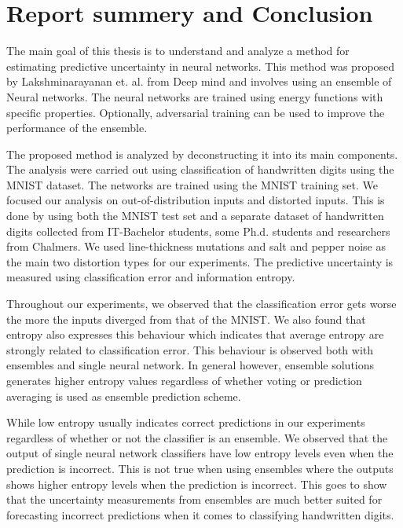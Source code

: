 \chapter{Report summery and Conclusion}

The main goal of this thesis is to understand and analyze a method for estimating predictive uncertainty in neural networks. This method was proposed by Lakshminarayanan et. al. from Deep mind and involves using an ensemble of Neural networks. The neural networks are trained using energy functions with specific properties. Optionally, adversarial training can be used to improve the performance of the ensemble.

The proposed method is analyzed by deconstructing it into its main components. The analysis were carried out using classification of handwritten digits using the MNIST dataset. The networks are trained using the MNIST training set. We focused our analysis on out-of-distribution inputs and distorted inputs. This is done by using both the MNIST test set and a separate dataset of handwritten digits collected from IT-Bachelor students, some Ph.d. students and researchers from Chalmers. We used line-thickness mutations and salt and pepper noise as the main two distortion types for our experiments. The predictive uncertainty is measured using classification error and information entropy.

Throughout our experiments, we observed that the classification error gets worse the more the inputs diverged from that of the MNIST. We also found that entropy also expresses this behaviour which indicates that average entropy are strongly related to classification error. This behaviour is observed both with ensembles and single neural network. In general however, ensemble solutions generates higher entropy values regardless of whether voting or prediction averaging is used as ensemble prediction scheme.

While low entropy usually indicates correct predictions in our experiments regardless of whether or not the classifier is an ensemble. We observed that the output of single neural network classifiers have low entropy levels even when the prediction is incorrect. This is not true when using ensembles where the outputs shows higher entropy levels when the prediction is incorrect. This goes to show that the uncertainty measurements from ensembles are much better suited for forecasting incorrect predictions when it comes to classifying handwritten digits. 

